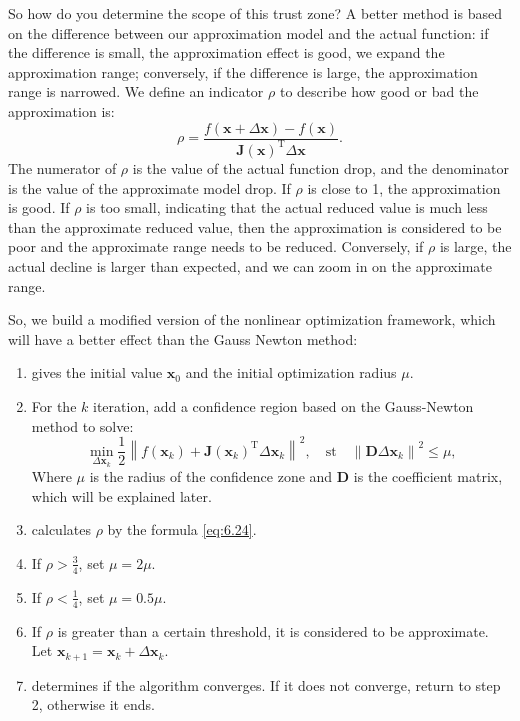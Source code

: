 So how do you determine the scope of this trust zone? A better method is based on the difference between our approximation model and the actual function: if the difference is small, the approximation effect is good, we expand the approximation range; conversely, if the difference is large, the approximation range is narrowed. We define an indicator $\rho$ to describe how good or bad the approximation is:
\begin{equation}\label{eq:6.24}
\rho = \frac{{f\left( {\bm{x} + \Delta \bm{x}} \right)} - ​​{{ {f\left( \bm{x} \right)} }}} { \bm{J}\left( \bm{x} \right)^\mathrm{T} \Delta \bm{x} } .
\end{equation}
The numerator of $\rho$ is the value of the actual function drop, and the denominator is the value of the approximate model drop. If $\rho$ is close to 1, the approximation is good. If $\rho$ is too small, indicating that the actual reduced value is much less than the approximate reduced value, then the approximation is considered to be poor and the approximate range needs to be reduced. Conversely, if $\rho$ is large, the actual decline is larger than expected, and we can zoom in on the approximate range.

So, we build a modified version of the nonlinear optimization framework, which will have a better effect than the Gauss Newton method:

\begin{mdframed}
\begin{enumerate}
\item gives the initial value $\bm{x}_0$ and the initial optimization radius $\mu$.
\item For the $k$ iteration, add a confidence region based on the Gauss-Newton method to solve:
\begin{equation}\label{eq:LM}
\mathop {\min }\limits_{\Delta \bm{x}_k} \frac{1}{2}{\left\| {f\left( \bm{x}_k \right) + \bm{J } \left( \bm{x}_k \right)^\mathrm{T} \Delta \bm{x}_k} \right\|^2}, \quad \mathrm{st}\quad {\left\| {\bm{D} \Delta \bm{x}_k} \right\|^2} \leqslant \mu ,
\end{equation}
Where $\mu$ is the radius of the confidence zone and $\bm{D}$ is the coefficient matrix, which will be explained later.
\item calculates $\rho$ by the formula \eqref{eq:6.24}.
\item If $\rho > \frac{3}{4}$, set $\mu = 2 \mu$.
\item If $\rho < \frac{1}{4}$, set $\mu = 0.5 \mu$.
\item If $\rho$ is greater than a certain threshold, it is considered to be approximate. Let $\bm{x}_{k+1} = \bm{x}_k+\Delta \bm{x}_k$.
\item determines if the algorithm converges. If it does not converge, return to step 2, otherwise it ends.
\end{enumerate}
 \end{mdframed}

